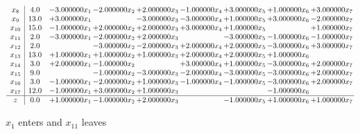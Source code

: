 \documentclass[10pt]{article}
\begin{document}
\[\begin{array}{c| c c@{\hskip 2pt} c@{\hskip 2pt} c@{\hskip 2pt} c@{\hskip 2pt} c@{\hskip 2pt} c@{\hskip 2pt} c@{\hskip 2pt} }
 x_{8}   &  4.0 & -3.000000 x_{1} & -2.000000 x_{2} & + 2.000000 x_{3} & -1.000000 x_{4} & + 3.000000 x_{5} & + 1.000000 x_{6} & + 3.000000 x_{7}\\
 x_{9}   &  13.0 & + 3.000000 x_{1} &   & -3.000000 x_{3} & -3.000000 x_{4} & + 1.000000 x_{5} & + 3.000000 x_{6} & -2.000000 x_{7}\\
 x_{10}   &  15.0 & -1.000000 x_{1} & + 2.000000 x_{2} & + 2.000000 x_{3} & + 3.000000 x_{4} & + 1.000000 x_{5} &   & + 1.000000 x_{7}\\
 x_{11}   &  2.0 & -3.000000 x_{1} & -2.000000 x_{2} & + 2.000000 x_{3} &   & -3.000000 x_{5} & -1.000000 x_{6} & -1.000000 x_{7}\\
 x_{12}   &  2.0  &   & -3.000000 x_{2} & -2.000000 x_{3} & + 2.000000 x_{4} & + 2.000000 x_{5} & -3.000000 x_{6} & + 3.000000 x_{7}\\
 x_{13}   &  13.0 & + 1.000000 x_{1} & + 1.000000 x_{2} & + 1.000000 x_{3} & + 2.000000 x_{4} & + 2.000000 x_{5} & + 1.000000 x_{6} &   \\
 x_{14}   &  3.0 & + 2.000000 x_{1} & -1.000000 x_{2} &   & + 3.000000 x_{4} & + 1.000000 x_{5} & -3.000000 x_{6} & + 2.000000 x_{7}\\
 x_{15}   &  9.0  &   & -1.000000 x_{2} & -3.000000 x_{3} & -2.000000 x_{4} & -3.000000 x_{5} & -3.000000 x_{6} & + 2.000000 x_{7}\\
 x_{16}   &  3.0 & -1.000000 x_{1} & -2.000000 x_{2} & + 1.000000 x_{3} & -1.000000 x_{4} & -1.000000 x_{5} & -3.000000 x_{6} & + 2.000000 x_{7}\\
 x_{17}   &  12.0 & -1.000000 x_{1} & + 3.000000 x_{2} & + 1.000000 x_{3} &    &   & -1.000000 x_{6} &   \\
\hline
z    &  0.0 & + 1.000000 x_{1} & -1.000000 x_{2} & + 2.000000 x_{3} &   & -1.000000 x_{5} & + 1.000000 x_{6} & + 1.000000 x_{7}\\
\end{array}\]


 $ x_{1} $ enters and $ x_{11} $ leaves 
\end{document}
